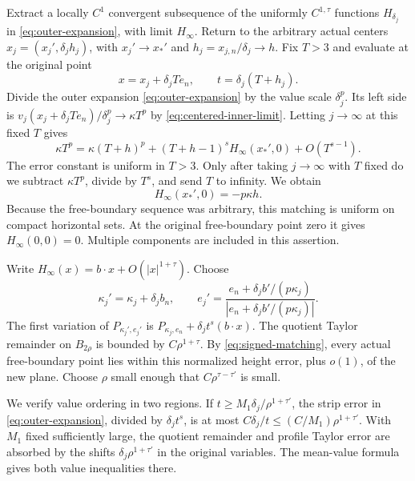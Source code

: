 \documentclass[11pt]{article}
\numberwithin{equation}{section}
\begin{document}
Extract a locally $C^1$ convergent subsequence of the uniformly
$C^{1,\tau}$ functions $H_{\delta_j}$ in \eqref{eq:outer-expansion}, with
limit $H_\infty$. Return to the arbitrary actual centers
$x_j=(x_j',\delta_jh_j)$, with $x_j'\to x_*'$ and
$h_j=x_{j,n}/\delta_j\to h$. Fix $T>3$ and evaluate at the original point
\[
             x=x_j+\delta_jTe_n,\qquad t=\delta_j(T+h_j).
\]
Divide the outer expansion \eqref{eq:outer-expansion} by the value scale
$\delta_j^p$. Its left side is
$v_j(x_j+\delta_jTe_n)/\delta_j^p\to\kappa T^p$ by
\eqref{eq:centered-inner-limit}. Letting $j\to\infty$ at this fixed $T$ gives
\begin{equation}\label{eq:matching-finite-T}
 \kappa T^p=\kappa(T+h)^p+(T+h-1)^sH_\infty(x_*',0)
                                        +O(T^{s-1}).
\end{equation}
The error constant is uniform in $T>3$. Only after taking $j\to\infty$
with $T$ fixed do we subtract $\kappa T^p$, divide by $T^s$, and send
$T$ to infinity. We obtain
\begin{equation}\label{eq:signed-matching}
                         H_\infty(x_*',0)=-p\kappa h.
\end{equation}
Because the free-boundary sequence was arbitrary, this matching is uniform
on compact horizontal sets. At the original free-boundary point zero it
gives $H_\infty(0,0)=0$. Multiple components are included in this assertion.

Write $H_\infty(x)=b\cdot x+O(|x|^{1+\tau})$. Choose
\begin{equation}\label{eq:new-profile}
 \kappa_j'=\kappa_j+\delta_j b_n,\qquad
 e_j'=\frac{e_n+\delta_j b'/(p\kappa_j)}
                         {|e_n+\delta_j b'/(p\kappa_j)|}.
\end{equation}
The first variation of $P_{\kappa_j',e_j'}$ is
$P_{\kappa_j,e_n}+\delta_j t^s(b\cdot x)$. The quotient Taylor remainder
on $B_{2\rho}$ is bounded by $C\rho^{1+\tau}$. By
\eqref{eq:signed-matching}, every actual free-boundary point lies within
this normalized height error, plus $o(1)$, of the new plane. Choose $\rho$
small enough that $C\rho^{\tau-\tau'}$ is small.

We verify value ordering in two regions. If
$t\geq M_1\delta_j/\rho^{1+\tau'}$, the strip error in
\eqref{eq:outer-expansion}, divided by $\delta_jt^s$, is at most
$C\delta_j/t\leq(C/M_1)\rho^{1+\tau'}$. With $M_1$ fixed sufficiently
large, the quotient remainder and profile Taylor error are absorbed by
the shifts $\delta_j\rho^{1+\tau'}$ in the original variables.
The mean-value formula gives both value inequalities there.
\end{document}
